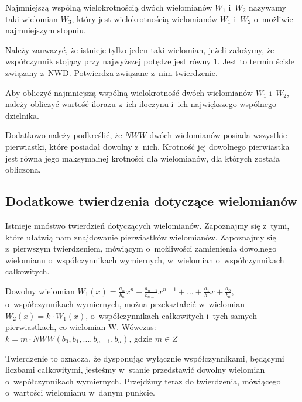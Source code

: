 \begin{definition}
	$ $\\
	Najmniejszą wspólną wielokrotnością dwóch wielomianów $W_1$ i~$W_2$ nazywamy taki wielomian $W_3$, który jest wielokrotnością wielomianów $W_1$ i~$W_2$ o~możliwie najmniejszym stopniu.
\end{definition}

Należy zauwazyć, że istnieje tylko jeden taki wielomian, jeżeli założymy, że współczynnik stojący przy najwyższej potędze jest równy $1$. Jest to termin ścisle związany z~NWD. Potwierdza związane z~nim twierdzenie.

\begin{theorem}
	Aby obliczyć najmniejszą wspólną wielokrotność dwóch wielomianów $W_1$ i~$W_2$, należy obliczyć wartość ilorazu z~ich iloczynu i~ich największego wspólnego dzielnika.
\end{theorem}

Dodatkowo należy podkreślić, że $NWW$ dwóch wielomianów posiada wszystkie pierwiastki, które posiadał dowolny z~nich. Krotność jej dowolnego pierwiastka jest równa jego maksymalnej krotności dla wielomianów, dla których została obliczona.

\subsection{Dodatkowe twierdzenia dotyczące wielomianów}

Istnieje mnóstwo twierdzień dotyczących wielomianów. Zapoznajmy się z~tymi, które ułatwią nam znajdowanie pierwiastków wielomianów. Zapoznajmy się z~pierwszym twierdzeniem, mówiącym o~możliwości zamienienia dowolnego wielomianu o~współczynnikach wymiernych, w~wielomian o~współczynnikach całkowitych.

\begin{theorem}
	$ $\\
	Dowolny wielomian $W_1(x) = \frac{a_n}{b_n}x^n + \frac{a_{n-1}}{b_{n-1}}x^{n-1} + ... + \frac{a_1}{b_1}x + \frac{a_0}{b_0}$, o~współczynnikach wymiernych, można przekształcić w~wielomian $W_2(x) = k \cdot W_1(x)$, o~współczynnikach całkowitych i~tych samych pierwiastkach, co wielomian W. Wówczas: \\
	$k = m \cdot NWW(b_0, b_1, ..., b_{n-1}, b_n)$, gdzie $m\in Z$
\end{theorem}

Twierdzenie to oznacza, że dysponując wyłącznie współczynnikami, będącymi liczbami całkowitymi, jesteśmy w~stanie przedstawić dowolny wielomian o~współczynnikach wymiernych. Przejdźmy teraz do twierdzenia, mówiącego o~wartości wielomianu w~danym punkcie.

